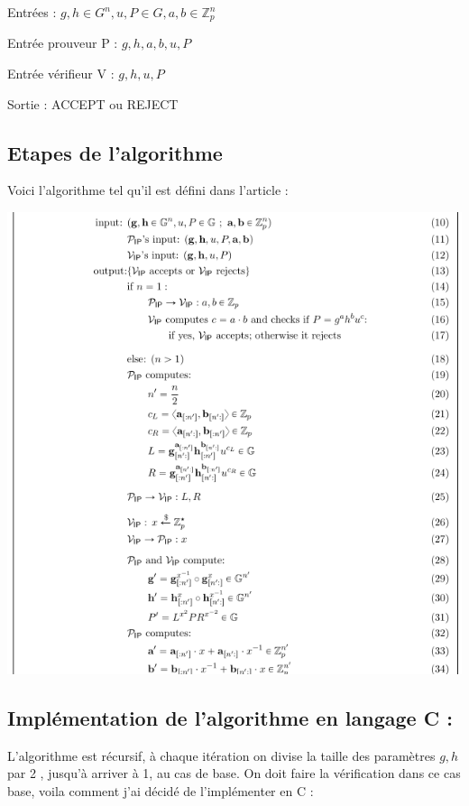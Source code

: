 \documentclass[a4paper]{article}
\theoremstyle{theorem}
\theoremstyle{definition}
\begin{document}
Entrées : $g, h \in G^{n}, u, P\in  G, a, b\in \mathbb{Z}_{p}^{n} $


Entrée prouveur P : $g,h,a,b,u,P$

Entrée vérifieur V : $g,h,u,P$

Sortie :  ACCEPT ou REJECT


\subsection{Etapes de l'algorithme}


Voici l'algorithme tel qu'il est défini dans l'article :




   
    \includegraphics[width=1\linewidth]{proofPro.png}

\subsection{Implémentation de l'algorithme en langage C : }
L'algorithme est récursif, à chaque itération on divise la taille des paramètres $g,h$ par 2 , jusqu'à arriver à 1, au cas de base. On doit faire la vérification dans ce cas base, voila comment j'ai décidé de l'implémenter en C : 
\end{document}

